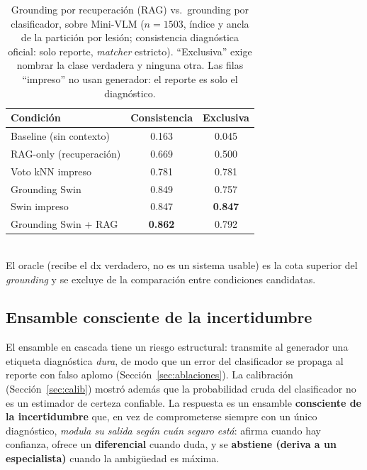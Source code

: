 \documentclass[11pt, a4paper]{article}
\begin{document}
\begin{table}[H]
  \centering
  \caption{Grounding por recuperación (RAG) vs.\ grounding por clasificador, sobre Mini-VLM ($n=1503$,
  índice y ancla de la partición por lesión; consistencia diagnóstica oficial: solo reporte, \emph{matcher}
  estricto). ``Exclusiva'' exige nombrar la clase verdadera y ninguna otra. Las filas ``impreso'' no usan
  generador: el reporte es solo el diagnóstico.}
  \label{tab:rag}
  \begin{tabular}{lcc}
    \toprule
    \textbf{Condición} & \textbf{Consistencia} & \textbf{Exclusiva} \\
    \midrule
    Baseline (sin contexto)        & 0.163 & 0.045 \\
    RAG-only (recuperación)        & 0.669 & 0.500 \\
    Voto kNN impreso               & 0.781 & 0.781 \\
    Grounding Swin                 & 0.849 & 0.757 \\
    Swin impreso                   & 0.847 & \textbf{0.847} \\
    Grounding Swin + RAG           & \textbf{0.862} & 0.792 \\
    \bottomrule
  \end{tabular}
  \\[2pt]
  {\footnotesize El oracle (recibe el dx verdadero, no es un sistema usable) es la cota superior del
  \emph{grounding} y se excluye de la comparación entre condiciones candidatas.}
\end{table}

\subsection{Ensamble consciente de la incertidumbre}
\label{sec:incertidumbre}
El ensamble en cascada tiene un riesgo estructural: transmite al generador una etiqueta diagnóstica
\emph{dura}, de modo que un error del clasificador se propaga al reporte con falso aplomo
(Sección~\ref{sec:ablaciones}). La calibración (Sección~\ref{sec:calib}) mostró además que la probabilidad
cruda del clasificador no es un estimador de certeza confiable. La respuesta es un ensamble
\textbf{consciente de la incertidumbre} que, en vez de comprometerse siempre con un único diagnóstico,
\emph{modula su salida según cuán seguro está}: afirma cuando hay confianza, ofrece un \textbf{diferencial}
cuando duda, y se \textbf{abstiene (deriva a un especialista)} cuando la ambigüedad es máxima.
\end{document}
